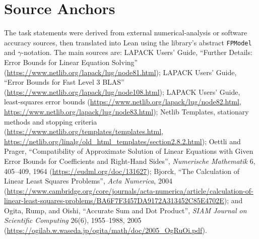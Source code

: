 \documentclass[10pt]{article}
\begin{document}
\section*{Source Anchors}

\footnotesize
The task statements were derived from external numerical-analysis or software
accuracy sources, then translated into Lean using the library's abstract
\texttt{FPModel} and \(\gamma\)-notation.  The main sources are:
LAPACK Users' Guide, ``Further Details: Error Bounds for Linear Equation
Solving'' (\url{https://www.netlib.org/lapack/lug/node81.html});
LAPACK Users' Guide, ``Error Bounds for Fast Level 3 BLAS''
(\url{https://www.netlib.org/lapack/lug/node108.html});
LAPACK Users' Guide, least-squares error bounds
(\url{https://www.netlib.org/lapack/lug/node82.html},
\url{https://www.netlib.org/lapack/lug/node83.html});
Netlib Templates, stationary methods and stopping criteria
(\url{https://www.netlib.org/templates/templates.html},
\url{https://netlib.org/linalg/old_html_templates/section2.8.2.html});
Oettli and Prager, ``Compatibility of Approximate Solution of Linear Equations
with Given Error Bounds for Coefficients and Right-Hand Sides'', \emph{Numerische
Mathematik} 6, 405--409, 1964 (\url{https://eudml.org/doc/131627});
Bjorck, ``The Calculation of Linear Least Squares Problems'', \emph{Acta
Numerica}, 2004
(\url{https://www.cambridge.org/core/journals/acta-numerica/article/calculation-of-linear-least-squares-problems/BA6F7F3457DA9172A313452C85E4702E});
and Ogita, Rump, and Oishi, ``Accurate Sum and Dot Product'', \emph{SIAM
Journal on Scientific Computing} 26(6), 1955--1988, 2005
(\url{https://ogilab.w.waseda.jp/ogita/math/doc/2005_OgRuOi.pdf}).
\end{document}
